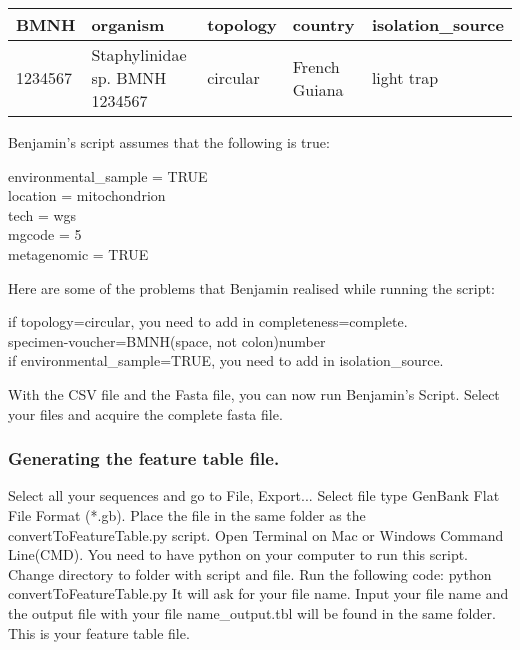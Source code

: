 \documentclass[11pt]{article}
\begin{document}
\begin{table}[H]
\centering
{}
\label{tab:bencsv}
\begin{tabular}{|l|l|l|l|l|}
\hline
\rowcolor[HTML]{FFCC67} 
BMNH & organism & topology & country & isolation\_source  \\ \hline
1234567 & Staphylinidae sp. BMNH 1234567 & circular & French Guiana & light trap \\ \hline
\end{tabular}
\end{table}

Benjamin's script assumes that the following is true:
\begin{displayquote}
environmental\_sample = TRUE \\
location = mitochondrion \\
tech = wgs \\
mgcode = 5 \\
metagenomic = TRUE 
\end{displayquote}

Here are some of the problems that Benjamin realised while running the script:
\begin{displayquote}
if topology=circular, you need to add in completeness=complete. \\
specimen-voucher=BMNH(space, not colon)number \\
if environmental\_sample=TRUE, you need to add in isolation\_source. \\
\end{displayquote}

With the CSV file and the Fasta file, you can now run Benjamin's Script. Select your files and acquire the complete fasta file. 


\subsubsection{Generating the feature table file.}
\label{subsubsec:table}
Select all your sequences and go to File, Export... Select file type GenBank Flat File Format (*.gb). Place the file in the same folder as the convertToFeatureTable.py script. Open Terminal on Mac or Windows Command Line(CMD). You need to have python on your computer to run this script. Change directory to folder with script and file. Run the following code: python convertToFeatureTable.py  It will ask for your file name. Input your file name and the output file with your file name\_output.tbl will be found in the same folder. This is your feature table file. 
\end{document}
